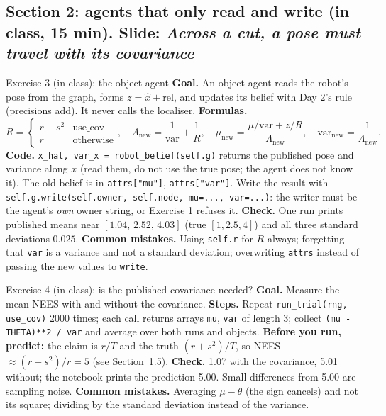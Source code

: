 \documentclass[11pt]{article}
\begin{document}
\subsection*{Section 2: agents that only read and write (in class, 15 min). Slide: \emph{Across a cut, a pose must travel with its covariance}}

\begin{labhelp}{Exercise 3 (in class): the object agent}
\textbf{Goal.} An object agent reads the robot's pose from the graph, forms $z=\hat x+\mathrm{rel}$, and updates its belief with Day 2's rule (precisions add). It never calls the localiser. \textbf{Formulas.}
\[
R=\begin{cases}r+s^2 & \text{use\_cov}\\ r & \text{otherwise}\end{cases},\quad
\Lambda_{\text{new}}=\frac1{\text{var}}+\frac1R,\quad
\mu_{\text{new}}=\frac{\mu/\text{var}+z/R}{\Lambda_{\text{new}}},\quad \text{var}_{\text{new}}=\frac1{\Lambda_{\text{new}}}.
\]
\textbf{Code.} \texttt{x\_hat, var\_x = robot\_belief(self.g)} returns the published pose and variance along $x$ (read them, do not use the true pose; the agent does not know it). The old belief is in \texttt{attrs["mu"]}, \texttt{attrs["var"]}. Write the result with \texttt{self.g.write(self.owner, self.node, mu=..., var=...)}: the writer must be the agent's \emph{own} owner string, or Exercise 1 refuses it. \textbf{Check.} One run prints published means near $[1.04,\,2.52,\,4.03]$ (true $[1,2.5,4]$) and all three standard deviations $0.025$. \textbf{Common mistakes.} Using \texttt{self.r} for $R$ always; forgetting that \texttt{var} is a variance and not a standard deviation; overwriting \texttt{attrs} instead of passing the new values to \texttt{write}.
\end{labhelp}

\begin{labhelp}{Exercise 4 (in class): is the published covariance needed?}
\textbf{Goal.} Measure the mean NEES with and without the covariance. \textbf{Steps.} Repeat \texttt{run\_trial(rng, use\_cov)} 2000 times; each call returns arrays \texttt{mu}, \texttt{var} of length 3; collect \texttt{(mu - THETA)**2 / var} and average over both runs and objects. \textbf{Before you run, predict:} the claim is $r/T$ and the truth $(r+s^2)/T$, so NEES $\approx (r+s^2)/r=5$ (see Section~1.5). \textbf{Check.} 1.07 with the covariance, 5.01 without; the notebook prints the prediction 5.00. Small differences from 5.00 are sampling noise. \textbf{Common mistakes.} Averaging $\mu-\theta$ (the sign cancels) and not its square; dividing by the standard deviation instead of the variance.
\end{labhelp}
\end{document}
